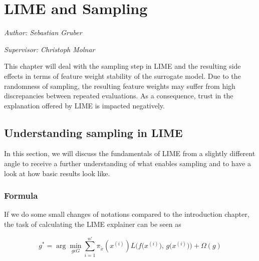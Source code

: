 \documentclass[]{krantz}
\begin{document}
\chapter{LIME and Sampling}\label{lime-sample}

\emph{Author: Sebastian Gruber}

\emph{Supervisor: Christoph Molnar}

This chapter will deal with the sampling step in LIME and the resulting
side effects in terms of feature weight stability of the surrogate
model. Due to the randomness of sampling, the resulting feature weights
may suffer from high discrepancies between repeated evaluations. As a
consequence, trust in the explanation offered by LIME is impacted
negatively.

\section{Understanding sampling in
LIME}\label{understanding-sampling-in-lime}

In this section, we will discuss the fundamentals of LIME from a
slightly different angle to receive a further understanding of what
enables sampling and to have a look at how basic results look like.

\subsection{Formula}\label{formula}

If we do some small changes of notations compared to the introduction
chapter, the task of calculating the LIME explainer can be seen as

\[ g^* = \arg\min_{g \epsilon G} \sum_{i=1}^{n'} \pi_{\tilde x}(x^{(i)}) L\Big( f\big(x^{(i)}\big), \, g\big(x^{(i)}\big) \Big) + \Omega\left(g\right) \]
\end{document}
